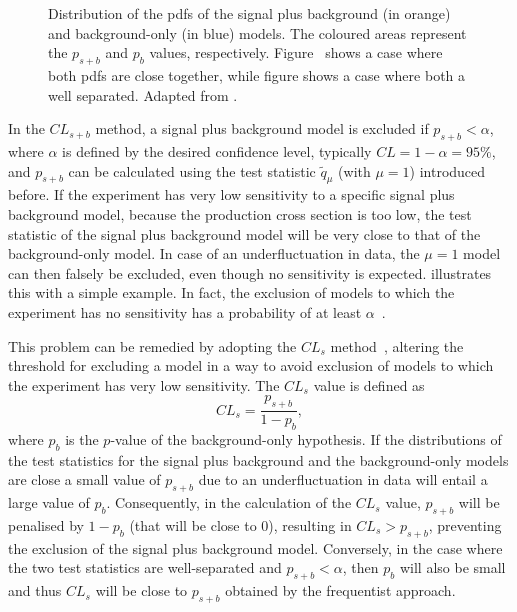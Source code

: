 \begin{figure}
\begin{subfigure}[b]{0.45\linewidth}
		\caption{\label{fig:cls_far}}
	\end{subfigure}%
	\caption{Distribution of the \glspl{pdf} of the signal plus background (in orange) and background-only (in blue) models. The coloured areas represent the $p_{s+b}$ and $p_{b}$ values, respectively. Figure~ shows a case where both \glspl{pdf} are close together, while figure  shows a case where both a well separated. Adapted from \cite{Cowan:2013pha}.}\label{fig:cls_method}
\end{figure}

In the $CL_{s+b}$ method, a signal plus background model is excluded if $p_{s+b} < \alpha$, where $\alpha$ is defined by the desired confidence level, typically $CL = 1 - \alpha = 95\%$, and $p_{s+b}$ can be calculated using the test statistic $\tilde{q}_\mu$ (with $\mu = 1$) introduced before. If the experiment has very low sensitivity to a specific signal plus background model, \eg because the production cross section is too low, the test statistic of the signal plus background model will be very close to that of the background-only model. In case of an underfluctuation in data, the $\mu = 1$ model can then falsely be excluded, even though no sensitivity is expected.  illustrates this with a simple example. In fact, the exclusion of models to which the experiment has no sensitivity has a probability of at least $\alpha$~\cite{Cowan:2013pha}.

This problem can be remedied by adopting the $CL_s$ method~\cite{Read:2002hq}, altering the threshold for excluding a model in a way to avoid exclusion of models to which the experiment has very low sensitivity. The $CL_s$ value is defined as
\begin{equation}
	CL_s = \frac{p_{s+b}}{1-p_b},
\end{equation}
where $p_b$ is the $p$-value of the background-only hypothesis. If the distributions of the test statistics for the signal plus background and the background-only models are close a small value of $p_{s+b}$ due to an underfluctuation in data will entail a large value of $p_b$. Consequently, in the calculation of the $CL_s$ value, $p_{s+b}$ will be penalised by $1-p_b$ (that will be close to 0), resulting in $CL_s > p_{s+b}$, preventing the exclusion of the signal plus background model. Conversely, in the case where the two test statistics are well-separated and $p_{s+b} < \alpha$, then $p_b$ will also be small and thus $CL_s$ will be close to $p_{s+b}$ obtained by the frequentist approach. 











